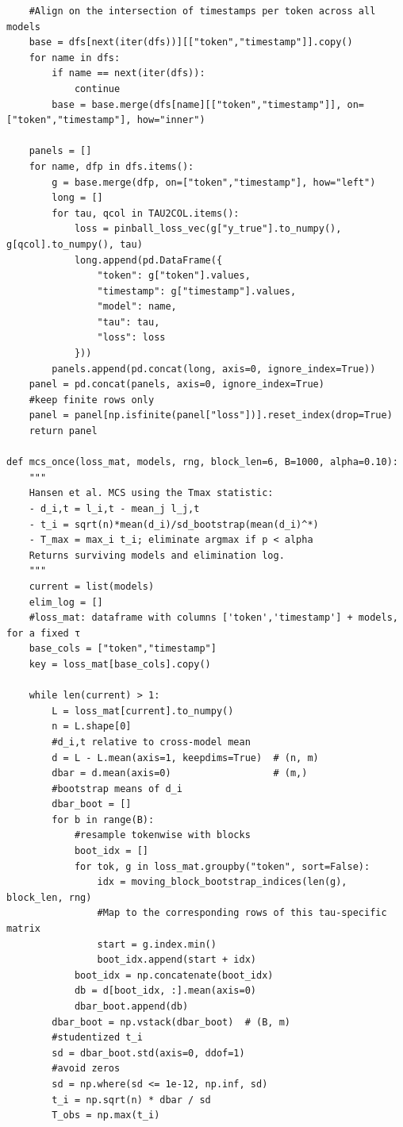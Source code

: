 \documentclass[
  a4paper,
  DIV=11,
  numbers=noendperiod]{scrreprt}
\begin{document}
\begin{verbatim}
    #Align on the intersection of timestamps per token across all models
    base = dfs[next(iter(dfs))][["token","timestamp"]].copy()
    for name in dfs:
        if name == next(iter(dfs)): 
            continue
        base = base.merge(dfs[name][["token","timestamp"]], on=["token","timestamp"], how="inner")

    panels = []
    for name, dfp in dfs.items():
        g = base.merge(dfp, on=["token","timestamp"], how="left")
        long = []
        for tau, qcol in TAU2COL.items():
            loss = pinball_loss_vec(g["y_true"].to_numpy(), g[qcol].to_numpy(), tau)
            long.append(pd.DataFrame({
                "token": g["token"].values,
                "timestamp": g["timestamp"].values,
                "model": name,
                "tau": tau,
                "loss": loss
            }))
        panels.append(pd.concat(long, axis=0, ignore_index=True))
    panel = pd.concat(panels, axis=0, ignore_index=True)
    #keep finite rows only
    panel = panel[np.isfinite(panel["loss"])].reset_index(drop=True)
    return panel

def mcs_once(loss_mat, models, rng, block_len=6, B=1000, alpha=0.10):
    """
    Hansen et al. MCS using the Tmax statistic:
    - d_i,t = l_i,t - mean_j l_j,t
    - t_i = sqrt(n)*mean(d_i)/sd_bootstrap(mean(d_i)^*)
    - T_max = max_i t_i; eliminate argmax if p < alpha
    Returns surviving models and elimination log.
    """
    current = list(models)
    elim_log = []
    #loss_mat: dataframe with columns ['token','timestamp'] + models, for a fixed τ
    base_cols = ["token","timestamp"]
    key = loss_mat[base_cols].copy()

    while len(current) > 1:
        L = loss_mat[current].to_numpy()
        n = L.shape[0]
        #d_i,t relative to cross-model mean
        d = L - L.mean(axis=1, keepdims=True)  # (n, m)
        dbar = d.mean(axis=0)                  # (m,)
        #bootstrap means of d_i
        dbar_boot = []
        for b in range(B):
            #resample tokenwise with blocks
            boot_idx = []
            for tok, g in loss_mat.groupby("token", sort=False):
                idx = moving_block_bootstrap_indices(len(g), block_len, rng)
                #Map to the corresponding rows of this tau-specific matrix
                start = g.index.min()
                boot_idx.append(start + idx)
            boot_idx = np.concatenate(boot_idx)
            db = d[boot_idx, :].mean(axis=0)
            dbar_boot.append(db)
        dbar_boot = np.vstack(dbar_boot)  # (B, m)
        #studentized t_i
        sd = dbar_boot.std(axis=0, ddof=1)
        #avoid zeros
        sd = np.where(sd <= 1e-12, np.inf, sd)
        t_i = np.sqrt(n) * dbar / sd
        T_obs = np.max(t_i)


\end{verbatim}
\end{document}
